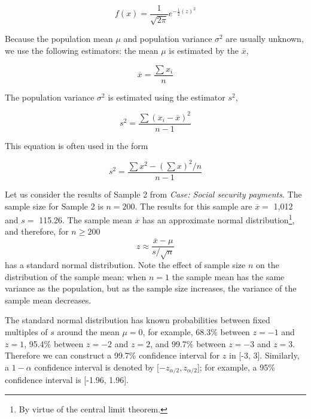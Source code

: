 \begin{equation}
f(x) = \frac{1}{\sqrt{2\pi}}e^{-\frac{1}{2}\left( z \right)^2}
\label{eq:standard_normal_distribution}
\end{equation}

Because the population mean $\mu$ and population variance $\sigma^2$ are usually unknown, we use the following estimators: the mean $\mu$ is estimated by the  $\overline{x}$,

\begin{equation}
\overline{x} = \frac{\sum{x_i}}{n}
\label{eq:sample_mean}
\end{equation}

The population variance $\sigma^2$ is estimated using the estimator $s^2$,

\begin{equation}
s^2 = \frac{\sum{(x_i - \overline{x})^2}}{n - 1}
\label{eq:sample_variance}
\end{equation}

This equation is often used in the form

\begin{equation}
s^2 = \frac{\sum{x^2 - (\sum{x})^2 / n}}{n - 1}
\label{eq:sample_var_shortcut}
\end{equation}

\bigskip
Let us consider the results of Sample 2 from \emph{Case: Social security payments}. The sample size for Sample 2 is $n = 200$. The results for this sample are $\overline{x} =$ 1,012 and $s =  $ 115.26. The sample mean $\overline{x}$ has an approximate normal distribution\footnote{By virtue of the central limit theorem.}, and therefore, for $n \geq 200$
\begin{equation}
z \approx \frac{\overline{x}-\mu}{s/\sqrt{n}} 
\label{eq:vanTnaarZ}
\end{equation}
has a standard normal distribution. Note the effect of sample size $n$ on the distribution of the sample mean: when $n = 1$ the sample mean has the same variance as the population, but as the sample size increases, the variance of the sample mean decreases.

\bigskip
The standard normal distribution has known probabilities between fixed multiples of $s$ around the mean $\mu = 0$, for example, 68.3\% between $z = -1$ and $z = 1$, 95.4\% between $z = -2$ and $z = 2$, and 99.7\% between $z = -3$ and $z = 3$. Therefore we can construct a 99.7\% confidence interval for $z$ in [-3, 3]. Similarly, a $1 - \alpha$ confidence interval is denoted by [$-z_{\alpha/2}, z_{\alpha/2}$]; for example, a 95\% confidence interval is [-1.96, 1.96].

